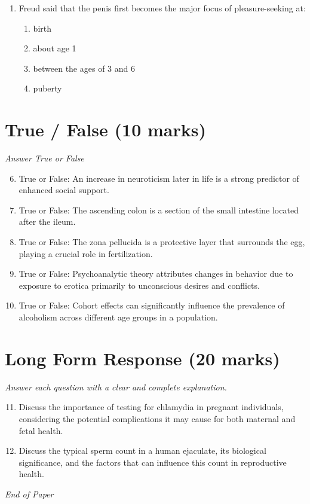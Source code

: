 \documentclass[12pt]{article}
\begin{document}
\begin{enumerate}[label=\arabic*.]
\begin{enumerate}[label=(\alph*)]
    \item it is an endangered species
    \item it is the closest to humans of any existing plant
    \item it is a small plant with a small genome size which can be raised inexpensively
\end{enumerate}
\item Freud said that the penis first becomes the major focus of pleasure-seeking at:
\begin{enumerate}[label=(\alph*)]
    \item birth
    \item about age 1
    \item between the ages of 3 and 6
    \item puberty
\end{enumerate}
\end{enumerate}

\section*{True / False (10 marks)}
\textit{Answer True or False}
\begin{enumerate}[label=\arabic*.]
\setcounter{enumi}{5}
\item True or False: An increase in neuroticism later in life is a strong predictor of enhanced social support.
\item True or False: The ascending colon is a section of the small intestine located after the ileum.
\item True or False: The zona pellucida is a protective layer that surrounds the egg, playing a crucial role in fertilization.
\item True or False: Psychoanalytic theory attributes changes in behavior due to exposure to erotica primarily to unconscious desires and conflicts.
\item True or False: Cohort effects can significantly influence the prevalence of alcoholism across different age groups in a population.
\end{enumerate}

\section*{Long Form Response (20 marks)}
\textit{Answer each question with a clear and complete explanation.}
\begin{enumerate}[label=\arabic*.]
\setcounter{enumi}{10}
\item Discuss the importance of testing for chlamydia in pregnant individuals, considering the potential complications it may cause for both maternal and fetal health.
\item Discuss the typical sperm count in a human ejaculate, its biological significance, and the factors that can influence this count in reproductive health.
\end{enumerate}

\vfill
\noindent\textit{End of Paper}
\end{document}
